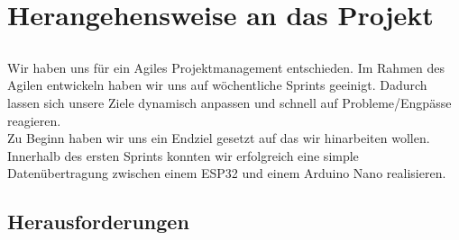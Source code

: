 \section{Herangehensweise an das Projekt}

\subsection{}

Wir haben uns für ein Agiles Projektmanagement entschieden. Im Rahmen des Agilen entwickeln haben wir uns auf wöchentliche Sprints geeinigt. Dadurch lassen sich unsere Ziele dynamisch anpassen und schnell auf Probleme/Engpässe reagieren.\\
Zu Beginn haben wir uns ein Endziel gesetzt auf das wir hinarbeiten wollen. Innerhalb des ersten Sprints konnten wir erfolgreich eine simple Datenübertragung zwischen einem ESP32 und einem Arduino Nano realisieren.

\subsection{Herausforderungen}
